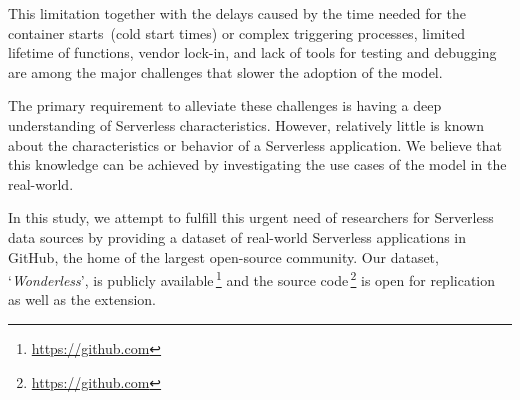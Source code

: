 This limitation together with the delays caused by the time needed 
for the container starts~(cold start times)\cite{manner2018cold} or 
complex triggering processes\cite{pelle2019towards}, 
limited lifetime of functions\cite{hellerstein2018serverless}, 
vendor lock-in, and lack of tools for testing and debugging are among 
the major challenges that slower the adoption of the \faas model. 

The primary requirement to alleviate these challenges is having a 
deep understanding of Serverless characteristics. However, relatively little is 
known about the characteristics or behavior of a Serverless application. 
We believe that this knowledge can be achieved by investigating the use 
cases of the \faas model in the real-world.

In this study, we attempt to fulfill this urgent need of researchers for 
Serverless data sources by providing a dataset of real-world Serverless 
applications in GitHub, the home of the largest open-source community. 
Our dataset, `\emph{Wonderless}', is publicly 
available\,\footnote{\url{https://github.com}} 
and the source code\,\footnote{\url{https://github.com}} 
is open for replication as well as the extension.
